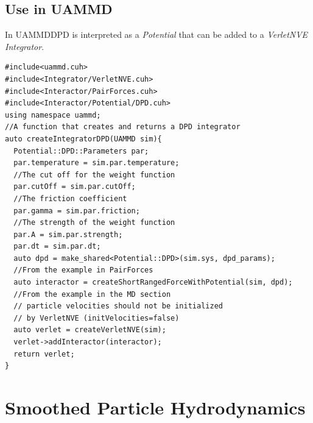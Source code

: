 \documentclass[ twoside,openright,titlepage,numbers=noenddot,%
headinclude,footinclude,cleardoublepage=empty,abstract=on,
BCOR=5mm,paper=a4,fontsize=11pt, dvipsnames
]{scrreprt}
\def\ucpp{uammd_cpp_lexer.py:UAMMDCppLexer -x}
\newcommand{\uammd}{\gls{UAMMD}\xspace}
\begin{document}
\subsection{Use in UAMMD}
In \uammd \gls{DPD} is interpreted as a \emph{Potential} that can be added to a \emph{VerletNVE} \emph{Integrator}.

\begin{verbatim}
#include<uammd.cuh>
#include<Integrator/VerletNVE.cuh>
#include<Interactor/PairForces.cuh>
#include<Interactor/Potential/DPD.cuh>
using namespace uammd;
//A function that creates and returns a DPD integrator
auto createIntegratorDPD(UAMMD sim){   
  Potential::DPD::Parameters par;
  par.temperature = sim.par.temperature;
  //The cut off for the weight function
  par.cutOff = sim.par.cutOff;
  //The friction coefficient
  par.gamma = sim.par.friction; 
  //The strength of the weight function
  par.A = sim.par.strength; 
  par.dt = sim.par.dt;  
  auto dpd = make_shared<Potential::DPD>(sim.sys, dpd_params);
  //From the example in PairForces
  auto interactor = createShortRangedForceWithPotential(sim, dpd);
  //From the example in the MD section
  // particle velocities should not be initialized
  // by VerletNVE (initVelocities=false)
  auto verlet = createVerletNVE(sim);
  verlet->addInteractor(interactor);
  return verlet;
}
\end{verbatim}


\section{Smoothed Particle Hydrodynamics}
\end{document}
